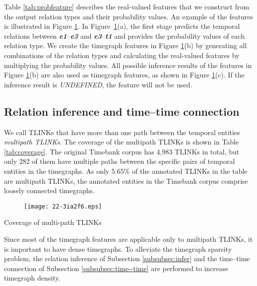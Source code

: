 \documentclass[english]{jnlp_1.4}
\begin{document}
Table \ref{tab:probfeature} describes the real-valued features that we construct from the output relation 
types and their probability values.
An example of the features is illustrated in Figure \ref{fig:prob}. 
In Figure~\ref{fig:prob}(a), the first stage predicts the temporal relations between \emph{\textbf{e1}}--\emph{\textbf{e3}} and \emph{\textbf{e3}}--\emph{\textbf{t1}} and provides the probability values of each relation type. 
We create the timegraph features in Figure \ref{fig:prob}(b) by generating all combinations of the relation types and calculating the real-valued features by multiplying the probability values.
All possible inference results of the features in Figure \ref{fig:prob}(b) are also used as timegraph features, as shown in Figure \ref{fig:prob}(c).
If the inference result is \emph{\footnotesize UNDEFINED}, the feature will not be used.


\subsection{Relation inference and time--time connection}
\label{subsec:infer}

We call TLINKs that have more than one path between the temporal entities \emph{multipath TLINKs}.
The coverage of the multipath TLINKs is shown in Table \ref{tab:coverage}.
The original Timebank corpus has 4,983 TLINKs in total, but only 282 of them have multiple paths between the specific pairs of temporal entities in the timegraphs.
As only 5.65\% of the annotated TLINKs in the table are multipath TLINKs, the annotated entities in the Timebank corpus comprise loosely connected timegraphs. 

\begin{figure}[t]
\begin{center}
\texttt{[image: 22-3ia2f6.eps]}
\end{center}
\label{fig:prob}
\end{figure}

\begin{table}[t]
\caption{Coverage of multi-path TLINKs}
\label{tab:coverage}

\end{table}

Since most of the timegraph features are applicable only to multipath TLINKs, it is important to have dense timegraphs.
To alleviate the timegraph sparsity problem, the relation inference of Subsection \ref{subsubsec:infer} and the time--time connection of Subsection \ref{subsubsec:time--time} are performed to increase timegraph density.
\end{document}
